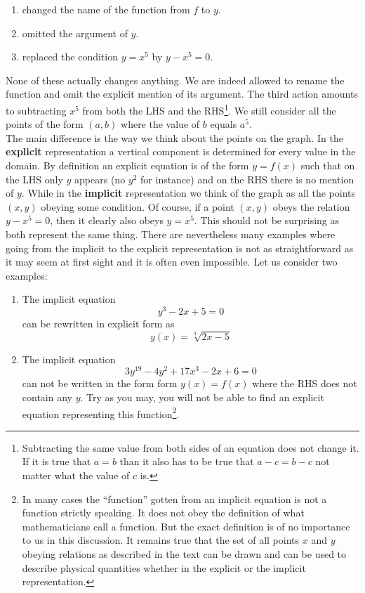 \begin{enumerate}
\item changed the name of the function from $f$ to $y$.
\item omitted the argument of $y$.
\item replaced the condition $y = x^5$ by $y - x^5 = 0$.
\end{enumerate}
\noindent None of these actually changes anything. We are indeed allowed to rename the function and omit the explicit mention of its argument. The third action amounts to subtracting $x^5$ from both the LHS and the RHS\footnote{Subtracting the same value from both sides of an equation does not change it. If it is true that $a = b$ than it also has to be true that $a-c=b-c$ not matter what the value of $c$ is.}. We still consider all the points of the form $\left(a,b\right)$ where the value of $b$ equals $a^5$.\\

\noindent The main difference is the way we think about the points on the graph. In the \textbf{explicit} representation a vertical component is determined for every value in the domain. By definition an explicit equation is of the form $y=f(x)$ such that on the LHS only $y$ appears (no $y^2$ for instance) and on the RHS there is no mention of $y$. While in the \textbf{implicit} representation we think of the graph as all the points $(x,y)$ obeying some condition. Of course, if a point $\left( x,y\right)$ obeys the relation $y-x^5=0$, then it clearly also obeys $y = x^5$. This should not be surprising as both represent the same thing. There are nevertheless many examples where going from the implicit to the explicit representation is not as straightforward as it may seem at first sight and it is often even impossible. Let us consider two examples: 
\begin{enumerate}
\item The implicit equation
$$
y^3 -2 x + 5 = 0
$$
can be rewritten in explicit form as
$$
y(x) = \sqrt[3]{2x - 5} 
$$
\item The implicit equation 
$$
3y^{19} - 4y^2 +17x^3 -2x +6 = 0
$$
can not be written in the form form $y(x) = f(x)$ where the RHS does not contain any $y$. Try as you may, you will not be able to find an explicit equation representing this function\footnote{In many cases the "`function"' gotten from an implicit equation is not a function strictly speaking. It does not obey the definition of what mathematicians call a function. But the exact definition is of no importance to us in this discussion. It remains true that the set of all points $x$ and $y$ obeying relations as described in the text can be drawn and can be used to describe physical quantities whether in the explicit or the implicit representation.}. 
\end{enumerate}


